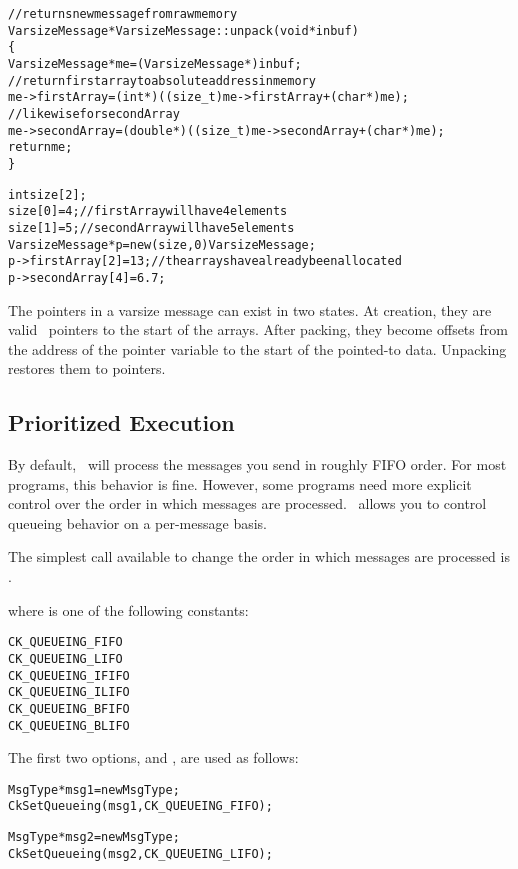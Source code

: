 \begin{alltt}
// returns new message from raw memory
VarsizeMessage* VarsizeMessage::unpack(void* inbuf)
\{
  VarsizeMessage* me = (VarsizeMessage*)inbuf;
  // return first array to absolute address in memory
  me->firstArray = (int*) ((size_t)me->firstArray + (char*)me);
  // likewise for secondArray
  me->secondArray = (double*) ((size_t)me->secondArray + (char*)me);
  return me;
\}

int size[2];
size[0] = 4;               // firstArray will have 4 elements
size[1] = 5;               // secondArray will have 5 elements 
VarsizeMessage* p = new(size, 0) VarsizeMessage;
p->firstArray[2] = 13;     // the arrays have already been allocated 
p->secondArray[4] = 6.7; 
\end{alltt}

The pointers in a varsize message can exist in two states.  At creation, they
are valid \CC\ pointers to the start of the arrays.  After packing, they become
offsets from the address of the pointer variable to the start of the pointed-to
data.  Unpacking restores them to pointers. 

\subsection{Prioritized Execution}
\label{prioritized message passing}

By default, \charmpp\ will process the messages you send in roughly
FIFO order.  For most programs, this
behavior is fine.  However, some programs need more explicit control
over the order in which messages are processed.  \charmpp\ allows you
to control queueing behavior on a per-message basis.

The simplest call available to change the order in which messages
are processed is .


where  is one of the following constants:

\begin{alltt}
  CK_QUEUEING_FIFO
  CK_QUEUEING_LIFO
  CK_QUEUEING_IFIFO
  CK_QUEUEING_ILIFO
  CK_QUEUEING_BFIFO
  CK_QUEUEING_BLIFO
\end{alltt}

The first two options,   and
, are used as follows: 

\begin{alltt}
  MsgType *msg1 = new MsgType ;
  CkSetQueueing(msg1, CK_QUEUEING_FIFO);

  MsgType *msg2 = new MsgType ;
  CkSetQueueing(msg2, CK_QUEUEING_LIFO);
\end{alltt}

